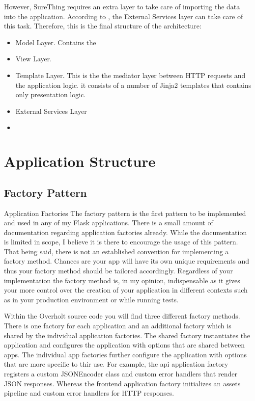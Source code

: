 However, SureThing requires an extra layer to take care of importing the data into the application. According to \citet{article:goodArchitecture}, the External Services layer can take care of this task. Therefore, this is the final structure of the architecture:

\begin{itemize}
	\item Model Layer. Contains the 
	\item View Layer. 
	\item Template Layer. This is the the mediator layer between HTTP requests and the application logic. it consists of a number of Jinja2 templates that contains only presentation logic.
	\item External Services Layer
	\item 
\end{itemize}

\section{Application Structure}
\subsection{Factory Pattern}
Application Factories
The factory pattern is the first pattern to be implemented and used in any of my Flask applications. There is a small amount of documentation regarding application factories already. While the documentation is limited in scope, I believe it is there to encourage the usage of this pattern. That being said, there is not an established convention for implementing a factory method. Chances are your app will have its own unique requirements and thus your factory method should be tailored accordingly. Regardless of your implementation the factory method is, in my opinion, indispensable as it gives your more control over the creation of your application in different contexts such as in your production environment or while running tests.

Within the Overholt source code you will find three different factory methods. There is one factory for each application and an additional factory which is shared by the individual application factories. The shared factory instantiates the application and configures the application with options that are shared between apps. The individual app factories further configure the application with options that are more specific to thir use. For example, the api application factory registers a custom JSONEncoder class and custom error handlers that render JSON responses. Whereas the frontend application factory initializes an assets pipeline and custom error handlers for HTTP responses.

